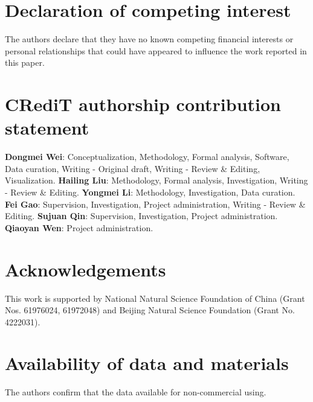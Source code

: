 \documentclass[
showpacs,  %
showkeys,  %
aps,       %
amsthm,    %
amsmath,   %
amsfonts,  %
amssymb    %
]{revtex4-1}          %
\begin{document}
\section*{Declaration of competing interest}
The authors declare that they have no known competing financial interests or personal relationships that could have appeared to influence the work reported in this paper.

\section*{CRediT authorship contribution statement}
\textbf{Dongmei Wei}: Conceptualization, Methodology, Formal analysis, Software, Data curation, Writing - Original draft, Writing - Review \& Editing, Visualization. \textbf{Hailing Liu}: Methodology, Formal analysis, Investigation, Writing - Review \& Editing. \textbf{Yongmei Li}: Methodology, Investigation, Data curation. \textbf{Fei Gao}: Supervision, Investigation, Project administration, Writing - Review \& Editing. \textbf{Sujuan Qin}: Supervision, Investigation, Project administration. \textbf{Qiaoyan Wen}: Project administration.

\section*{Acknowledgements}
This work is supported by National Natural Science Foundation of China (Grant Nos. 61976024, 61972048) and Beijing Natural Science Foundation (Grant No. 4222031).

\section*{Availability of data and materials }
The authors confirm that the data available for non-commercial using.
\end{document}
